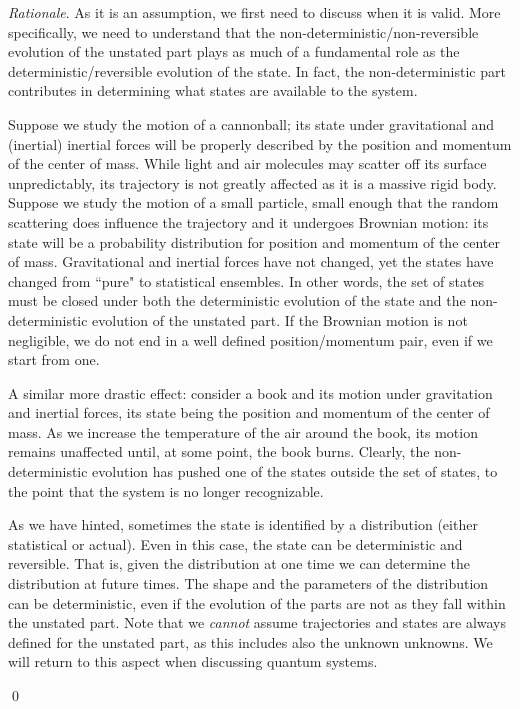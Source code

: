 \documentclass[aps,pra,10pt,twocolumn,floatfix,nofootinbib]{revtex4-1}
\numberwithin{equation}{section}
\theoremstyle{definition}
\newenvironment{rationale}{\emph{Rationale}.}{\qed}
\begin{document}
\begin{rationale}
As it is an assumption, we first need to discuss when it is valid. More specifically, we need to understand that the non-deterministic/non-reversible evolution of the unstated part plays as much of a fundamental role as the deterministic/reversible evolution of the state. In fact, the non-deterministic part contributes in determining what states are available to the system.

Suppose we study the motion of a cannonball; its state under gravitational and (inertial) inertial forces will be properly described by the position and momentum of the center of mass. While light and air molecules may scatter off its surface unpredictably, its trajectory is not greatly affected as it is a massive rigid body. Suppose we study the motion of a small particle, small enough that the random scattering does influence the trajectory and it undergoes Brownian motion: its state will be a probability distribution for position and momentum of the center of mass. Gravitational and inertial forces have not changed, yet the states have changed from ``pure" to statistical ensembles. In other words, the set of states must be closed under both the deterministic evolution of the state and the non-deterministic evolution of the unstated part. If the Brownian motion is not negligible, we do not end in a well defined position/momentum pair, even if we start from one.

A similar more drastic effect: consider a book and its motion under gravitation and inertial forces, its state being the position and momentum of the center of mass. As we increase the temperature of the air around the book, its motion remains unaffected until, at some point, the book burns. Clearly, the non-deterministic evolution has pushed one of the states outside the set of states, to the point that the system is no longer recognizable.

As we have hinted, sometimes the state is identified by a distribution (either statistical or actual). Even in this case, the state can be deterministic and reversible. That is, given the distribution at one time we can determine the distribution at future times. The shape and the parameters of the distribution can be deterministic, even if the evolution of the parts are not as they fall within the unstated part. Note that we \emph{cannot} assume trajectories and states are always defined for the unstated part, as this includes also the unknown unknowns. We will return to this aspect when discussing quantum systems.


\end{rationale}
\end{document}
